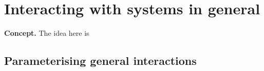 \chapter{\sffamily Interacting with systems in general}

{\bfseries\sffamily Concept.} The idea here is 

\section{\sffamily Parameterising general interactions}